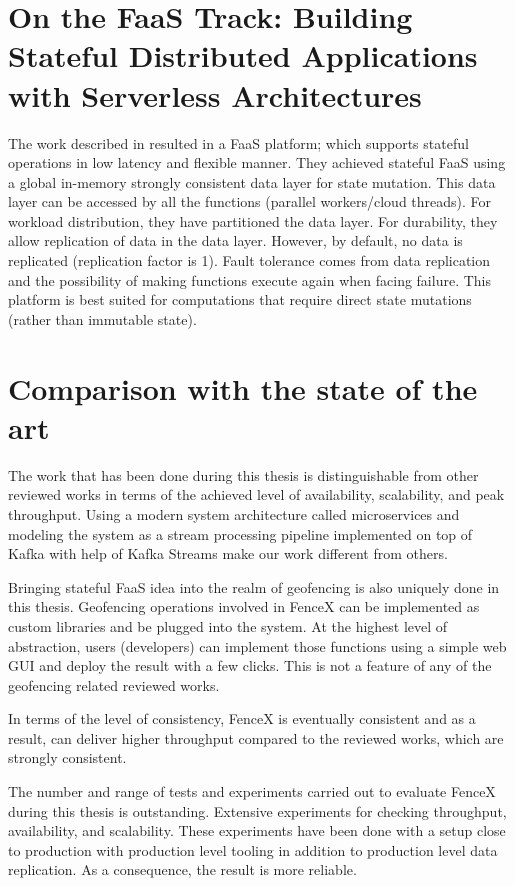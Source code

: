 \documentclass[a4]{report}
\begin{document}
    \section{On the FaaS Track: Building Stateful Distributed Applications with Serverless Architectures}
    The work described in \cite{mutableStateless} resulted in a FaaS platform;
    which supports stateful operations in low latency and flexible manner.
    They achieved stateful FaaS using a global in-memory strongly consistent data layer for state mutation.
    This data layer can be accessed by all the functions (parallel workers/cloud threads).
    For workload distribution, they have partitioned the data layer.
    For durability, they allow replication of data in the data layer.
    However, by default, no data is replicated (replication factor is 1).
    Fault tolerance comes from data replication and the possibility of making functions execute again when facing failure.
    This platform is best suited for computations that require direct state mutations (rather than immutable state).


    \section{Comparison with the state of the art}
    The work that has been done during this thesis is distinguishable from other reviewed works in terms of the
    achieved level of availability, scalability, and peak throughput.
    Using a modern system architecture called microservices and modeling the system as a stream processing pipeline
    implemented on top of Kafka with help of Kafka Streams make our work different from others.

    Bringing stateful FaaS idea into the realm of geofencing is also uniquely done in this thesis.
    Geofencing operations involved in FenceX can be implemented as custom libraries and be plugged into the system.
    At the highest level of abstraction, users (developers) can implement those functions using a simple web GUI and deploy the result with a few clicks.
    This is not a feature of any of the geofencing related reviewed works.

    In terms of the level of consistency, FenceX is eventually consistent and as a result, can deliver higher throughput
    compared to the reviewed works, which are strongly consistent.

    The number and range of tests and experiments carried out to evaluate FenceX during this thesis is
    outstanding.
    Extensive experiments for checking throughput, availability, and scalability.
    These experiments have been done with a setup close to production with production level tooling in addition to production level data replication.
    As a consequence, the result is more reliable.
\end{document}
